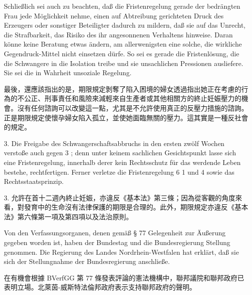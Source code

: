 \documentclass[12pt]{article}
\begin{document}
\syncleft
\begin{sourcepara}
Schließlich sei auch zu beachten, daß die Fristenregelung gerade der bedrängten Frau jede Möglichkeit nehme, einen auf Abtreibung gerichteten Druck des Erzeugers oder sonstiger Beteiligter dadurch zu mildern, daß sie auf das Unrecht, die Strafbarkeit, das Risiko des ihr angesonnenen Verhaltens hinweise. Daran könne keine Beratung etwas ändern, am allerwenigsten eine solche, die wirkliche Gegendruck-Mittel nicht einsetzen dürfe. So sei es gerade die Fristenlösung, die die Schwangere in die Isolation treibe und sie unsachlichen Pressionen ausliefere. Sie sei die in Wahrheit unsoziale Regelung.
\end{sourcepara}
\begin{transpara}
最後，還應該指出的是，期限規定剝奪了陷入困境的婦女透過指出她正在考慮的行為的不公正、刑事責任和風險來減輕來自生產者或其他相關方的終止妊娠壓力的機會。沒有任何諮詢可以改變這一點，尤其是不允許使用真正的反壓力措施的諮詢。正是期限規定使懷孕婦女陷入孤立，並使她面臨無關的壓力。這其實是一種反社會的規定。
\end{transpara}

\syncleft
\begin{sourcepara}
3. Die Freigabe des Schwangerschaftsabbruchs in den ersten zwölf Wochen verstoße auch gegen \abbrArt{} 3 \abbrGG{}\ggfnArtThreeDE{}; denn unter keinem sachlichen Gesichtspunkt lasse sich eine Fristenregelung, innerhalb derer kein Rechtsschutz für das werdende Leben bestehe, rechtfertigen. Ferner verletze die Fristenregelung \abbrArt{} 6 \abbrAbs{} 1 und \abbrAbs{} 4 \abbrGG{}\ggfnArtSixOneFourDE{} sowie das Rechtsstaatsprinzip.
\end{sourcepara}
\begin{transpara}
3. 允許在首十二週內終止妊娠，亦違反《基本法》第三條\ggfnArtThreeZH{}；因為從客觀的角度來看，對發育中的生命沒有法律保護的期限是合理的。此外，期限規定亦違反《基本法》第六條第一項及第四項\ggfnArtSixOneFourZH{}以及法治原則。
\end{transpara}

\syncleft
\begin{sourcepara}
Von den Verfassungsorganen, denen gemäß § 77 \abbrBVerfGG{} Gelegenheit zur Äußerung gegeben worden ist, haben der Bundestag und die Bundesregierung Stellung genommen. Die Regierung des Landes Nordrhein-Westfalen hat erklärt, daß sie sich der Stellungnahme der Bundesregierung anschließe.
\end{sourcepara}
\begin{transpara}
在有機會根據 BVerfGG 第 77 條發表評論的憲法機構中，聯邦議院和聯邦政府已表明立場。北萊茵-威斯特法倫邦政府表示支持聯邦政府的聲明。
\end{transpara}
\end{document}
